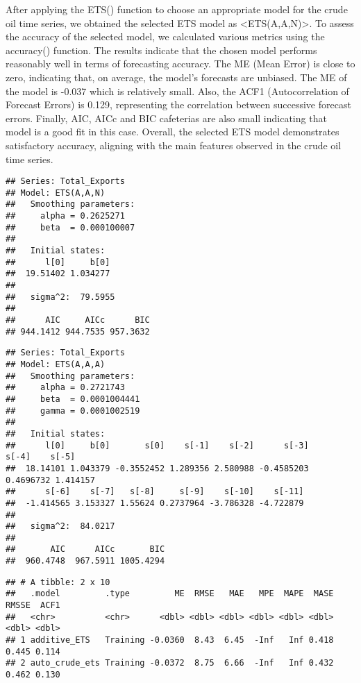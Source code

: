 \documentclass[
]{article}
\begin{document}
After applying the ETS() function to choose an appropriate model for the
crude oil time series, we obtained the selected ETS model as
\textless ETS(A,A,N)\textgreater. To assess the accuracy of the selected
model, we calculated various metrics using the accuracy() function. The
results indicate that the chosen model performs reasonably well in terms
of forecasting accuracy. The ME (Mean Error) is close to zero,
indicating that, on average, the model's forecasts are unbiased. The ME
of the model is -0.037 which is relatively small. Also, the ACF1
(Autocorrelation of Forecast Errors) is 0.129, representing the
correlation between successive forecast errors. Finally, AIC, AICc and
BIC cafeterias are also small indicating that model is a good fit in
this case. Overall, the selected ETS model demonstrates satisfactory
accuracy, aligning with the main features observed in the crude oil time
series.

\begin{verbatim}
## Series: Total_Exports 
## Model: ETS(A,A,N) 
##   Smoothing parameters:
##     alpha = 0.2625271 
##     beta  = 0.000100007 
## 
##   Initial states:
##      l[0]     b[0]
##  19.51402 1.034277
## 
##   sigma^2:  79.5955
## 
##      AIC     AICc      BIC 
## 944.1412 944.7535 957.3632
\end{verbatim}

\begin{verbatim}
## Series: Total_Exports 
## Model: ETS(A,A,A) 
##   Smoothing parameters:
##     alpha = 0.2721743 
##     beta  = 0.0001004441 
##     gamma = 0.0001002519 
## 
##   Initial states:
##      l[0]     b[0]       s[0]    s[-1]    s[-2]      s[-3]     s[-4]    s[-5]
##  18.14101 1.043379 -0.3552452 1.289356 2.580988 -0.4585203 0.4696732 1.414157
##      s[-6]    s[-7]   s[-8]     s[-9]    s[-10]    s[-11]
##  -1.414565 3.153327 1.55624 0.2737964 -3.786328 -4.722879
## 
##   sigma^2:  84.0217
## 
##       AIC      AICc       BIC 
##  960.4748  967.5911 1005.4294
\end{verbatim}

\begin{verbatim}
## # A tibble: 2 x 10
##   .model         .type         ME  RMSE   MAE   MPE  MAPE  MASE RMSSE  ACF1
##   <chr>          <chr>      <dbl> <dbl> <dbl> <dbl> <dbl> <dbl> <dbl> <dbl>
## 1 additive_ETS   Training -0.0360  8.43  6.45  -Inf   Inf 0.418 0.445 0.114
## 2 auto_crude_ets Training -0.0372  8.75  6.66  -Inf   Inf 0.432 0.462 0.130
\end{verbatim}
\end{document}
